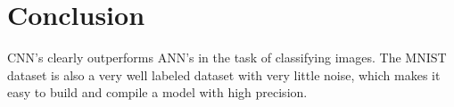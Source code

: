 \section{Conclusion}

CNN's clearly outperforms ANN's in the task of classifying images. The MNIST dataset is also a very well labeled dataset with very little noise, which makes it easy to build and compile a model with high precision. 